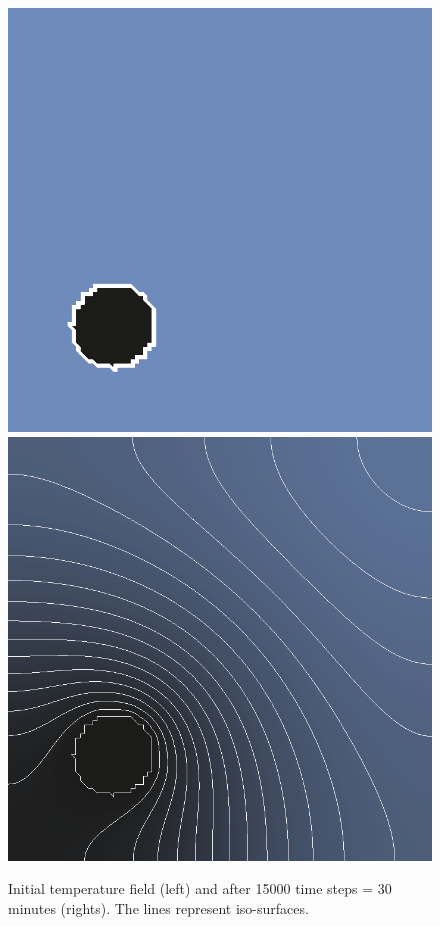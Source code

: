 \begin{figure}[!htb]
  \centering
  \includegraphics[width=.4\textwidth]{figures/hot-point-1}
  \hfill
  \includegraphics[width=.4\textwidth]{figures/hot-point-2}
  \caption{Initial temperature field (left) and after 15000 time steps = 30 minutes (rights). The lines represent iso-surfaces.}
  \label{fig:htm:explicit:dynamic}
\end{figure}

